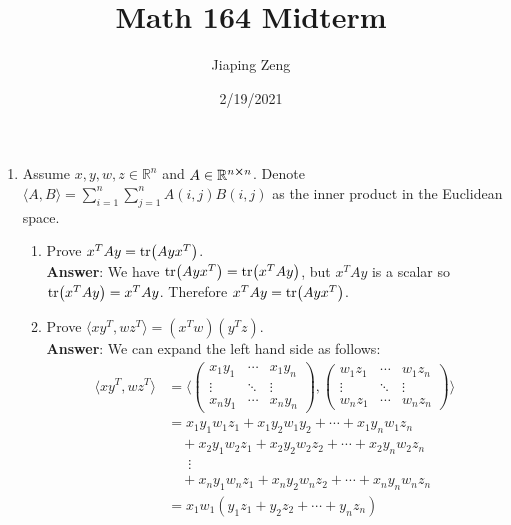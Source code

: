 \documentclass{article}
\title{Math 164 Midterm}
\date{2/19/2021}
\author{Jiaping Zeng}
\begin{document}

\begin{enumerate}
    \item Assume $x,y,w,z\in\mathbb{R}^n$ and $A\in\mathbb{R}^{n\cross n}$. Denote $\langle A,B\rangle=\sum_{i=1}^n\sum_{j=1}^n A(i,j)B(i,j)$ as the inner product in the Euclidean space.
          \begin{enumerate}
              \item Prove $x^TAy=\tr(Ayx^T)$.\\
                    \textbf{Answer}: We have $\tr(Ayx^T)=\tr(x^TAy)$, but $x^TAy$ is a scalar so $\tr(x^TAy)=x^TAy$. Therefore $x^TAy=\tr(Ayx^T)$.
              \item Prove $\langle xy^T,wz^T\rangle=(x^Tw)(y^Tz)$.\\
                    \textbf{Answer}: We can expand the left hand side as follows:
                    \begin{align*}
                        \langle xy^T,wz^T\rangle & =\langle\begin{pmatrix}
                            x_1y_1 & \cdots & x_1y_n \\
                            \vdots & \ddots & \vdots \\
                            x_ny_1 & \cdots & x_ny_n
                        \end{pmatrix},\begin{pmatrix}
                            w_1z_1 & \cdots & w_1z_n \\
                            \vdots & \ddots & \vdots \\
                            w_nz_1 & \cdots & w_nz_n
                        \end{pmatrix}\rangle \\
                                                 & =x_1y_1w_1z_1+x_1y_2w_1y_2+\cdots+x_1y_nw_1z_n                    \\
                                                 & \quad+x_2y_1w_2z_1+x_2y_2w_2z_2+\cdots+x_2y_nw_2z_n               \\
                                                 & \quad\;\:\vdots                                                    \\
                                                 & \quad+x_ny_1w_nz_1+x_ny_2w_nz_2+\cdots+x_ny_nw_nz_n                \\
                                                 & =x_1w_1(y_1z_1+y_2z_2+\cdots+y_nz_n)                               \\

\end{align*}
\end{enumerate}
\end{enumerate}
\end{document}
